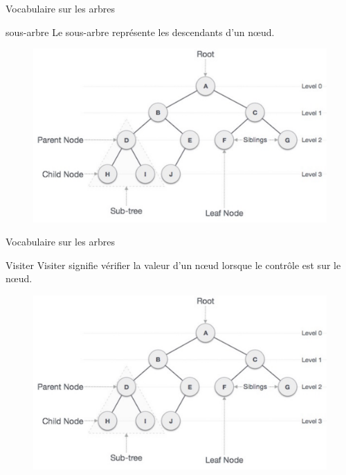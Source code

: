\documentclass[10pt,xcolor=dvipsnames]{beamer}
\newcommand{\defin}[1]{\textcolor{darkspringgreen}{#1}}
\begin{document}
\begin{frame}{Vocabulaire sur les arbres}
        \begin{exampleblock}{sous-arbre}
   Le \defin{sous-arbre} représente les descendants d'un nœud.
    \end{exampleblock}
    
    \begin{figure}
    \centering
    \includegraphics[scale=0.2]{figures/CM2/ABR-1.png}
    \label{fig:my_label}
\end{figure}
\end{frame}

\begin{frame}{Vocabulaire sur les arbres}
        \begin{exampleblock}{Visiter}
    \defin{Visiter} signifie vérifier la valeur d'un nœud lorsque le contrôle est sur le nœud.
    \end{exampleblock}
    
    \begin{figure}
    \centering
    \includegraphics[scale=0.2]{figures/CM2/ABR-1.png}
    \label{fig:my_label}
\end{figure}
\end{frame}
\end{document}
